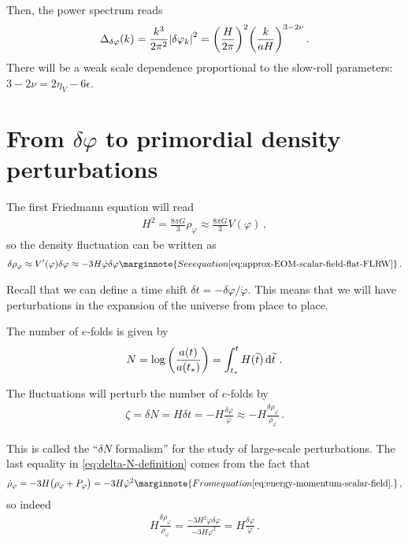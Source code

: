 \documentclass[main.tex]{subfiles}
\begin{document}
Then, the power spectrum reads 
%
\begin{align} \label{eq:scalar-field-power-spectrum}
\Delta_{ \delta \varphi }(k) = \frac{k^3}{2 \pi^2} \abs{ \delta \varphi _k}^2 = \qty( \frac{H}{2 \pi })^2 \qty( \frac{k}{aH})^{3-2\nu }
\,.
\end{align}
%
There will be a weak scale dependence proportional to the slow-roll parameters: \(3 - 2 \nu = 2 \eta _V - 6 \epsilon \).

\section{From \(\delta \varphi \) to primordial density perturbations}

The first Friedmann equation will read 
%
\begin{align}
H^2 = \frac{8 \pi G}{3} \rho_\varphi  \approx \frac{8 \pi G}{3} V(\varphi )
\,,
\end{align}
%
so the density fluctuation can be written as 
%
\begin{align}
\delta \rho _\varphi \approx V' (\varphi ) \delta \varphi \approx - 3 H \dot{\varphi} \delta \varphi 
\marginnote{See equation \eqref{eq:approx-EOM-scalar-field-flat-FLRW}}
\,.
\end{align}

Recall that we can define a time shift \(\delta t = - \delta \varphi / \dot{\varphi} \).
This means that we will have perturbations in the expansion of the universe from place to place.

The number of \(e\)-folds is given by 
%
\begin{align}
N = \log \qty( \frac{a(t)}{a (t_*)}) = \int_{t_*}^{t} H(\widetilde{t}) \dd{\widetilde{t}}
\,.
\end{align}

The fluctuations will perturb the number of \(e\)-folds by 
%
\begin{align} \label{eq:delta-N-definition}
\zeta = 
\delta N = H \delta t = - H \frac{ \delta \varphi }{\dot{\varphi}} \approx - H \frac{ \delta \rho _\varphi }{ \dot{\rho}_\varphi }
\,.
\end{align}

This is called the ``\(\delta N\) formalism'' for the study of large-scale perturbations.
The last equality in \eqref{eq:delta-N-definition} comes from the fact that 
%
\begin{align}
\dot{\rho}_\varphi = - 3H \qty(\rho _\varphi + P_\varphi ) = - 3 H \dot{\varphi}^2
\marginnote{From equation \eqref{eq:energy-momentum-scalar-field}.}
\,,
\end{align}
%
so indeed 
%
\begin{align}
H \frac{ \delta \rho _\varphi }{\dot{\rho}_\varphi } 
= \frac{- 3 H^2 \dot{\varphi}  \delta \varphi }{-3 H \dot{\varphi}^2} 
= H \frac{ \delta \varphi }{\dot{\varphi}}
\,.
\end{align}
\end{document}

